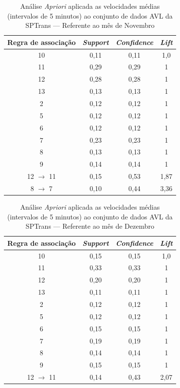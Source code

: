 \documentclass[
	12pt,				%
	oneside,			%
	a4paper,			%
	english,			%
	brazil				%
	]{abntex2ppgsi}
\begin{document}
{{{\begin{apendicesenv}
\begin{table}[!htb]
\centering
\caption {Análise \textit{Apriori} aplicada as velocidades médias (intervalos de 5 minutos) ao conjunto de dados AVL da SPTrans --- Referente ao mês de Novembro}
\label {tab:aprioriNovember}
\begin{tabular}{c|c|c|c}
\toprule
\textbf{Regra de associação} & \textit{\textbf{Support}} & \textit{\textbf{Confidence}} & \textit{\textbf{Lift}} \\
\midrule
10 &  0,11 &  0,11 &  1,0\\
\hline
11 &  0,29 &  0,29 &  1\\
\hline
12 &  0,28 &  0,28 &  1\\
\hline
13 &  0,13 &  0,13 &  1\\
\hline
2 &  0,12 &  0,12 &  1\\
\hline
5 &  0,12 &  0,12 &  1\\
\hline
6 &  0,12 &  0,12 &  1\\
\hline
7 &  0,23 &  0,23 &  1\\
\hline
8 &  0,13 &  0,13 &  1\\
\hline
9 &  0,14 &  0,14 &  1\\
\hline
12 $\rightarrow$ 11 &  0,15 &  0,53 &  1,87\\
\hline
8 $\rightarrow$ 7 &  0,10 &  0,44 &  3,36\\
\bottomrule
\end{tabular}
\end{table}


\begin{table}[!htb]
\centering
\caption {Análise \textit{Apriori} aplicada as velocidades médias (intervalos de 5 minutos) ao conjunto de dados AVL da SPTrans --- Referente ao mês de Dezembro}
\label {tab:aprioriDecember}
\begin{tabular}{c|c|c|c}
\toprule
\textbf{Regra de associação} & \textit{\textbf{Support}} & \textit{\textbf{Confidence}} & \textit{\textbf{Lift}} \\
\midrule
10 &  0,15 &  0,15 &  1,0\\
\hline
11 &  0,33 &  0,33 &  1\\
\hline
12 &  0,20 &  0,20 &  1\\
\hline
13 &  0,11 &  0,11 &  1\\
\hline
2 &  0,12 &  0,12 &  1\\
\hline
5 &  0,12 &  0,12 &  1\\
\hline
6 &  0,15 &  0,15 &  1\\
\hline
7 &  0,19 &  0,19 &  1\\
\hline
8 &  0,14 &  0,14 &  1\\
\hline
9 &  0,15 &  0,15 &  1\\
\hline
12 $\rightarrow$ 11 &  0,14 &  0,43 &  2,07\\
\bottomrule
\end{tabular}
\end{table}


\end{apendicesenv}}}}
\end{document}
